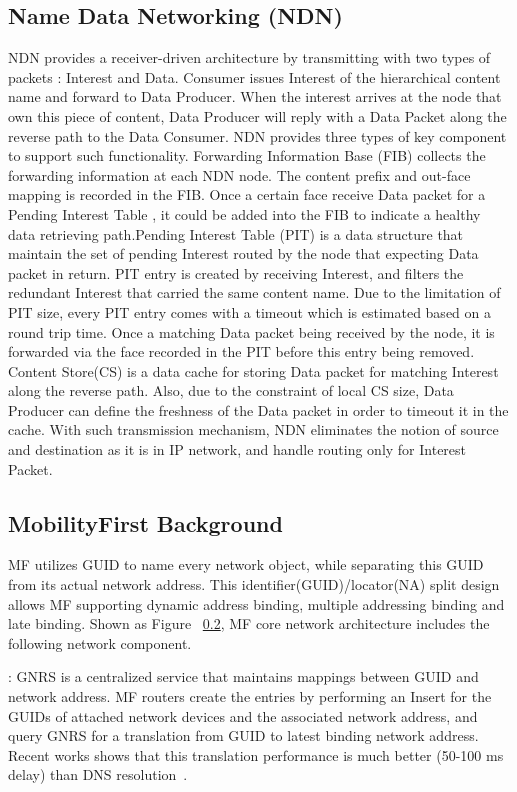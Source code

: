 \subsection{Name Data Networking (NDN)}
NDN provides a receiver-driven architecture by transmitting with two types of packets : Interest and Data. Consumer issues Interest of the hierarchical content name and forward to Data Producer. When the interest arrives at the node that own this piece of content, Data Producer will reply with a Data Packet along the reverse path to the Data Consumer. NDN provides three types of key component to support such functionality. Forwarding Information Base (FIB) collects the forwarding information at each NDN node. The content prefix and out-face mapping is recorded in the FIB. Once a certain face receive Data packet for a Pending Interest Table , it could be added into the FIB to indicate a healthy data retrieving path.Pending Interest Table (PIT) is a data structure that maintain the set of pending Interest routed by the node that expecting Data packet in return. PIT entry is created by receiving Interest, and filters the redundant Interest that carried the same content name. Due to the limitation of PIT size, every PIT entry comes with a timeout which is estimated based on a round trip time. Once a matching Data packet being received by the node, it is forwarded via the face recorded in the PIT before this entry being removed. Content Store(CS) is a data cache for storing Data packet for matching Interest along the reverse path. Also, due to the constraint of local CS size, Data Producer can define the freshness of the Data packet in order to timeout it in the cache. With such transmission mechanism, NDN eliminates the notion of source and destination as it is in IP network, and handle routing only for Interest Packet.

\subsection{MobilityFirst Background}
MF utilizes GUID to name every network object, while separating this GUID from its actual network address. This identifier(GUID)/locator(NA) split design allows MF supporting dynamic address binding, multiple addressing binding and late binding. Shown as Figure ~\ref{}, MF core network architecture includes the following network component.

\vspace{1mm}: GNRS is a centralized service that maintains mappings between GUID and network address. MF routers create the entries by performing an Insert for the GUIDs of attached network devices and the associated network address, and query GNRS for a translation from GUID to latest binding network address. Recent works shows that this translation performance is much better (50-100 ms delay) than DNS resolution~\cite{vu2012dmap}.

